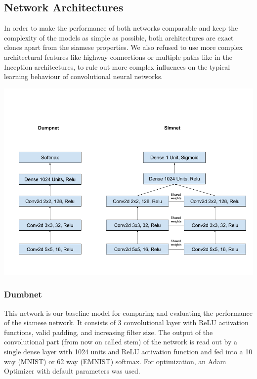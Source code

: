 ﻿\documentclass[a4paper,pt12]{article}
\begin{document}
\subsection{Network Architectures}
In order to make the performance of both networks comparable and keep the complexity of the models as simple as possible, both architectures are exact clones apart from the siamese properties. We also refused to use more complex architectural features like highway connections or multiple paths like in the Inception architectures, to rule out more complex influences on the typical learning behaviour of convolutional neural networks.

\includegraphics[scale=0.3]{nets.png}

\subsubsection{Dumbnet}
This network is our baseline model for comparing and evaluating the performance of the siamese network.  It consists of 3 convolutional layer with ReLU activation functions, valid padding, and increasing filter size. \newline
The output of the convolutional part (from now on called stem) of the network is read out by a single dense layer with 1024 units and ReLU activation function and fed into a 10 way (MNIST) or 62 way (EMNIST) softmax. For optimization, an Adam Optimizer with default parameters was used.
\end{document}
